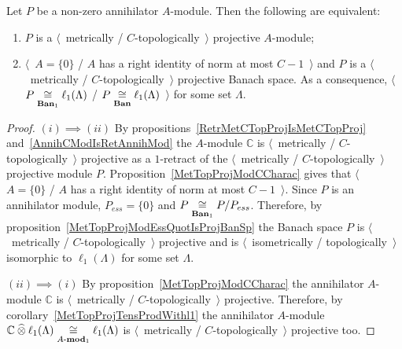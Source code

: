 \begin{proposition}\label{MetTopProjOfAnnihModCharac} Let $P$ be a non-zero
annihilator $A$-module. Then the following are equivalent:

\begin{enumerate}[label = (\roman*)]
    \item $P$ is a $\langle$~metrically / $C$-topologically~$\rangle$ projective
    $A$-module;

    \item $\langle$~$A= \{0 \}$ / $A$ has a right identity of norm at most
    $C-1$~$\rangle$ and $P$ is a $\langle$~metrically /
    $C$-topologically~$\rangle$ projective Banach space. As a consequence,
    $\langle$~$P\mathrel{\mathop{\cong}\limits_{\mathbf{Ban}_1}}\ell_1(\Lambda)$ /
    $P\mathrel{\mathop{\cong}\limits_{\mathbf{Ban}}}\ell_1(\Lambda)$~$\rangle$ for some set $\Lambda$.
\end{enumerate}
\end{proposition}
\begin{proof} $(i)\implies (ii)$ By 
propositions~\ref{RetrMetCTopProjIsMetCTopProj} 
and~\ref{AnnihCModIsRetAnnihMod} the
$A$-module $\mathbb{C}$ is $\langle$~metrically / $C$-topologically~$\rangle$
projective as a $1$-retract of the $\langle$~metrically / $C$-topologically~$\rangle$
projective module $P$. Proposition~\ref{MetTopProjModCCharac} gives that
$\langle$~$A= \{0 \}$ / $A$ has a right identity of norm at most $C-1$~$\rangle$.
Since $P$ is an annihilator module, $P_{ess}= \{0 \}$ and
$P\mathrel{\mathop{\cong}\limits_{\mathbf{Ban}_1}}P/P_{ess}$. Therefore, by
proposition~\ref{MetTopProjModEssQuotIsProjBanSp} the Banach space $P$ is
$\langle$~metrically / $C$-topologically~$\rangle$ projective and is
$\langle$~isometrically / topologically~$\rangle$ isomorphic to
$\ell_1(\Lambda)$ for some set $\Lambda$.

$(ii)\implies (i)$ By proposition~\ref{MetTopProjModCCharac} the annihilator
$A$-module $\mathbb{C}$ is $\langle$~metrically / $C$-topologically~$\rangle$
projective. Therefore, by corollary~\ref{MetTopProjTensProdWithl1} the
annihilator $A$-module
$\mathbb{C}\mathbin{\widehat{\otimes}}\ell_1(\Lambda)\mathrel{\mathop{\cong}\limits_{A\text{-}\mathbf{mod}_1}}\ell_1(\Lambda)$ is
$\langle$~metrically / $C$-topologically~$\rangle$ projective too.
\end{proof}

